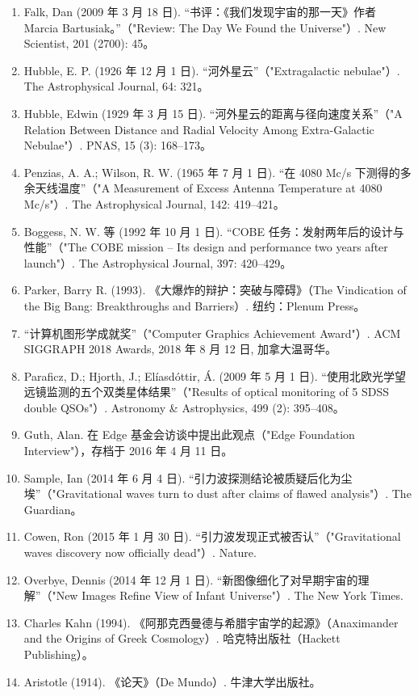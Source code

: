 \begin{enumerate}
\item Falk, Dan (2009 年 3 月 18 日). “书评：《我们发现宇宙的那一天》作者 Marcia Bartusiak。”（"Review: The Day We Found the Universe"）. New Scientist, 201 (2700): 45。  
\item Hubble, E. P. (1926 年 12 月 1 日). “河外星云”（"Extragalactic nebulae"）. The Astrophysical Journal, 64: 321。  
\item Hubble, Edwin (1929 年 3 月 15 日). “河外星云的距离与径向速度关系”（"A Relation Between Distance and Radial Velocity Among Extra-Galactic Nebulae"）. PNAS, 15 (3): 168–173。  
\item Penzias, A. A.; Wilson, R. W. (1965 年 7 月 1 日). “在 4080 Mc/s 下测得的多余天线温度”（"A Measurement of Excess Antenna Temperature at 4080 Mc/s"）. The Astrophysical Journal, 142: 419–421。  
\item Boggess, N. W. 等 (1992 年 10 月 1 日). “COBE 任务：发射两年后的设计与性能”（"The COBE mission – Its design and performance two years after launch"）. The Astrophysical Journal, 397: 420–429。  
\item Parker, Barry R. (1993). 《大爆炸的辩护：突破与障碍》（The Vindication of the Big Bang: Breakthroughs and Barriers）. 纽约：Plenum Press。  
\item “计算机图形学成就奖”（"Computer Graphics Achievement Award"）. ACM SIGGRAPH 2018 Awards, 2018 年 8 月 12 日, 加拿大温哥华。  
\item Paraficz, D.; Hjorth, J.; Elíasdóttir, Á. (2009 年 5 月 1 日). “使用北欧光学望远镜监测的五个双类星体结果”（"Results of optical monitoring of 5 SDSS double QSOs"）. Astronomy & Astrophysics, 499 (2): 395–408。  
\item Guth, Alan. 在 Edge 基金会访谈中提出此观点（"Edge Foundation Interview"），存档于 2016 年 4 月 11 日。  
\item Sample, Ian (2014 年 6 月 4 日). “引力波探测结论被质疑后化为尘埃”（"Gravitational waves turn to dust after claims of flawed analysis"）. The Guardian。  
\item Cowen, Ron (2015 年 1 月 30 日). “引力波发现正式被否认”（"Gravitational waves discovery now officially dead"）. Nature.  
\item Overbye, Dennis (2014 年 12 月 1 日). “新图像细化了对早期宇宙的理解”（"New Images Refine View of Infant Universe"）. The New York Times.  
\item Charles Kahn (1994). 《阿那克西曼德与希腊宇宙学的起源》（Anaximander and the Origins of Greek Cosmology）. 哈克特出版社（Hackett Publishing）。  
\item Aristotle (1914). 《论天》（De Mundo）. 牛津大学出版社。  

\end{enumerate}
